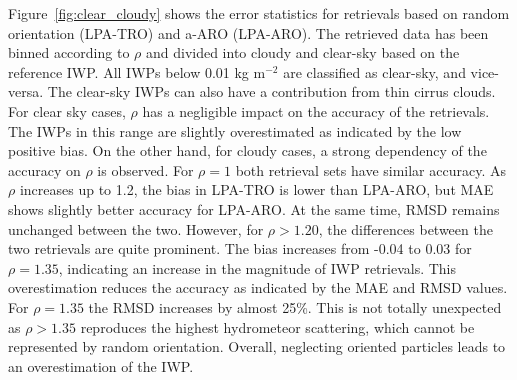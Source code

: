 \documentclass[amt, manuscript]{copernicus}
\begin{document}
Figure~\ref{fig:clear_cloudy} shows the error statistics for retrievals based on random orientation (LPA-TRO) and a-ARO (LPA-ARO). The retrieved data has been binned according to $\rho$ and divided into cloudy and clear-sky based on the reference IWP.  All IWPs below 0.01\,\,kg m$^{-2}$ are classified as clear-sky, and vice-versa. The clear-sky IWPs can also have a contribution from thin cirrus clouds. For clear sky cases, $\rho$ has a negligible impact on the accuracy of the retrievals. The IWPs in this range are slightly overestimated as indicated by the low positive bias. On the other hand, for cloudy cases, a strong dependency of the accuracy on $\rho$ is observed. For $\rho = 1$ both retrieval sets have similar accuracy. As $\rho$ increases up to 1.2, the bias in LPA-TRO is lower than LPA-ARO, but MAE shows slightly better accuracy for LPA-ARO. At the same time, RMSD remains unchanged between the two. However, for $\rho > 1.20$, the differences between the two retrievals are quite prominent. The bias increases from -0.04 to 0.03 for $\rho = 1.35$, indicating an increase in the magnitude of IWP retrievals. This overestimation reduces the accuracy as indicated by the MAE and RMSD values. For $\rho = 1.35$ the RMSD increases by almost 25\%. This is  not totally unexpected as $\rho > 1.35$ reproduces the highest hydrometeor scattering, which cannot be represented by random orientation. Overall, neglecting oriented particles leads to an overestimation of the IWP. 



\end{document}
